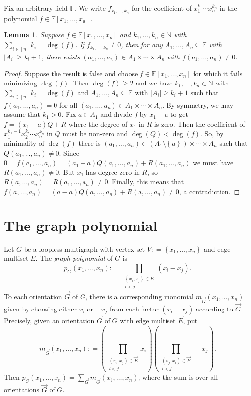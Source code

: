 \documentclass{tufte-book} %
\theoremstyle{plain}
\newtheorem{lemma}{Lemma}
\newcommand{\set}[1]{\left\{ #1 \right\}}
\newcommand{\card}[1]{\left|#1\right|}
\newcommand{\irange}[1]{\left[#1\right]}
\newcommand{\parens}[1]{\left( #1 \right)}
\newcommand{\DefinedAs}{\mathrel{\mathop:}=}
\newcommand{\IN}{\mathbb{N}}
\begin{document}
Fix an arbitrary field $\mathbb{F}$. We write $f_{k_1, \ldots, k_n}$ for the coefficient of $x_1^{k_1}\cdots x_n^{k_n}$ in the polynomial $f \in \mathbb{F}[x_1, \ldots, x_n]$. 
\begin{lemma}
Suppose $f \in \mathbb{F}[x_1, \ldots, x_n]$ and $k_1, \ldots, k_n \in \IN$ with $\sum_{i \in \irange{n}} k_i = \deg(f)$.  If $f_{k_1, \ldots, k_n} \ne 0$, then for any $A_1, \ldots, A_n \subseteq \mathbb{F}$ with $\card{A_i} \ge k_i + 1$, there exists $(a_1, \ldots, a_n) \in A_1 \times \cdots \times A_n$ with $f(a_1, \ldots, a_n) \ne 0$.
\end{lemma}
\begin{proof}
Suppose the result is false and choose $f \in \mathbb{F}[x_1, \ldots, x_n]$ for which it fails 
minimizing $\deg(f)$. Then $\deg(f) \ge 2$ and we have $k_1, \ldots, k_n \in \IN$ with $\sum_{i \in \irange{n}} k_i = \deg(f)$ and 
$A_1, \ldots, A_n \subseteq \mathbb{F}$ with $\card{A_i} \ge k_i + 1$ such that $f(a_1, \ldots, a_n) = 0$ for all $(a_1, \ldots, a_n) \in A_1 \times \cdots \times A_n$.  
By symmetry, we may assume that $k_1 > 0$.  Fix $a \in A_1$ and divide $f$ by $x_1 - a$ to get $f = (x_1 - a)Q + R$ where the degree of $x_1$ in $R$ is zero.  
Then the coefficient of $x_1^{k_1-1}x_2^{k_2} \cdots x_n^{k_n}$ in $Q$ must be non-zero and $\deg(Q) < \deg(f)$.  So, by minimality of $\deg(f)$ there 
is $(a_1, \ldots, a_n) \in (A_1 \setminus \set{a}) \times \cdots \times A_n$ such that $Q(a_1,\ldots, a_n) \ne 0$.  
Since $0 = f(a_1,\ldots, a_n) = (a_1 - a)Q(a_1,\ldots, a_n) + R(a_1,\ldots, a_n)$ we must have $R(a_1,\ldots, a_n) \ne 0$.  
But $x_1$ has degree zero in $R$, so $R(a,\ldots, a_n) = R(a_1,\ldots, a_n) \ne 0$.  
Finally, this means that $f(a,\ldots, a_n) = (a-a)Q(a,\ldots, a_n) + R(a,\ldots, a_n) \ne 0$, a contradiction.
\end{proof}

\section{The graph polynomial}
Let $G$ be a loopless multigraph with vertex set $V \DefinedAs \set{x_1, \ldots, x_n}$ and edge multiset $E$.  The \emph{graph polynomial} of $G$ is
\[p_G(x_1,\ldots,x_n) \DefinedAs \prod_{\substack{\set{x_i,x_j} \in E\\i < j}} (x_i - x_j).\]
To each orientation $\vec{G}$ of $G$, there is a corresponding monomial $m_{\vec{G}}(x_1,\ldots, x_n)$ given by choosing either $x_i$ or $-x_j$ from each factor $(x_i - x_j)$ according to $\vec{G}$. Precisely, given an orientation $\vec{G}$ of $G$ with edge multiset $\vec{E}$, put
\[m_{\vec{G}}(x_1,\ldots, x_n) \DefinedAs \parens{\prod_{\substack{(x_i,x_j) \in \vec{E}\\i < j}} x_i}\parens{\prod_{\substack{(x_j,x_i) \in \vec{E}\\i < j}} -x_j}.\]
Then $p_G(x_1,\ldots,x_n) = \sum_{\vec{G}} m_{\vec{G}}(x_1,\ldots, x_n)$, where the sum is over all orientations $\vec{G}$ of $G$.  
\end{document}
